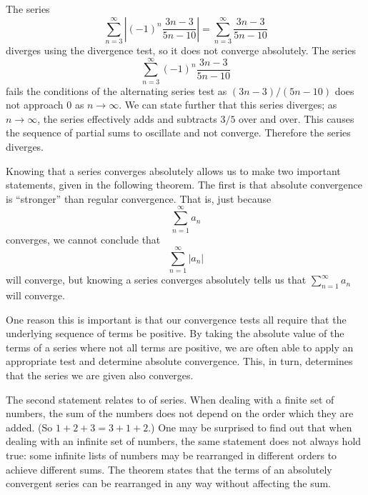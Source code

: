 \documentclass{ximera}
\begin{document}
\begin{question}
\begin{question}
\begin{question}
\begin{prompt}
\begin{multipleChoice}
        \end{multipleChoice}
        \begin{feedback}
	  The series
          \[
          \sum_{n=3}^\infty \left|(-1)^n\frac{3n-3}{5n-10}\right| =
          \sum_{n=3}^\infty \frac{3n-3}{5n-10}
          \]
          diverges using the divergence test, so it does not converge
          absolutely.  The series
          \[
          \sum_{n=3}^\infty (-1)^n\frac{3n-3}{5n-10}
          \]
          fails the conditions of the alternating series test as
          $(3n-3)/(5n-10)$ does not approach $0$ as $n\to\infty$. We
          can state further that this series diverges; as
          $n\to\infty$, the series effectively adds and subtracts
          $3/5$ over and over. This causes the sequence of partial
          sums to oscillate and not converge.  Therefore the series
          diverges.
        \end{feedback}
      \end{prompt}
    \end{question}
  \end{question}
\end{question}

Knowing that a series converges absolutely allows us to make two
important statements, given in the following theorem. The first is
that absolute convergence is ``stronger'' than regular
convergence. That is, just because
\[
\sum_{n=1}^\infty a_n
\]
converges, we cannot conclude that
\[
\sum_{n=1}^\infty |a_n|
\]
will converge, but knowing a series converges absolutely tells us that
$\sum_{n=1}^\infty a_n$ will converge.

One reason this is important is that our convergence tests all require
that the underlying sequence of terms be positive. By taking the
absolute value of the terms of a series where not all terms are
positive, we are often able to apply an appropriate test and determine
absolute convergence. This, in turn, determines that the series we are
given also converges.

The second statement relates to  of series. When
dealing with a finite set of numbers, the sum of the numbers does not
depend on the order which they are added. (So $1+2+3 = 3+1+2$.) One
may be surprised to find out that when dealing with an infinite set of
numbers, the same statement does not always hold true: some infinite
lists of numbers may be rearranged in different orders to achieve
different sums. The theorem states that the terms of an absolutely
convergent series can be rearranged in any way without affecting the
sum.
\end{document}
